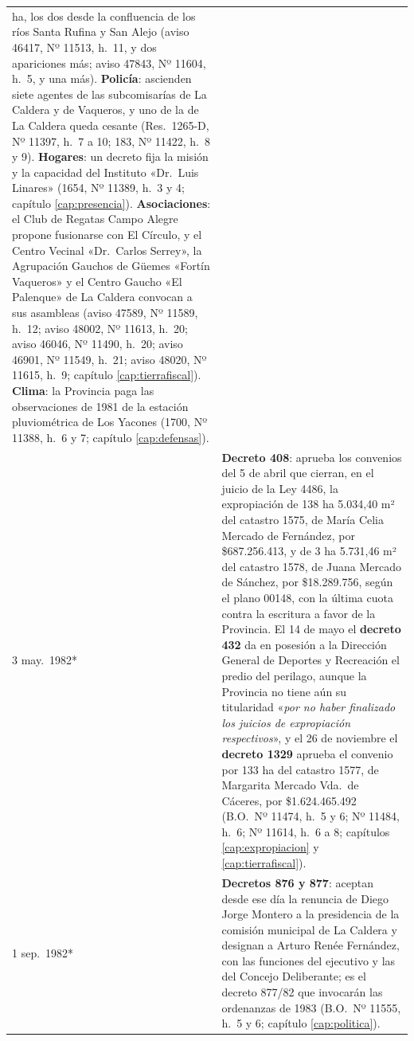\begin{longtable}{@{}p{2.7cm}p{10.3cm}@{}}
ha, los dos desde la confluencia de los ríos Santa Rufina y San Alejo (aviso 46417, Nº 11513, h.\ 11, y dos apariciones más; aviso 47843, Nº 11604, h.\ 5, y una más). \textbf{Policía}: ascienden siete agentes de las subcomisarías de La Caldera y de Vaqueros, y uno de la de La Caldera queda cesante (Res.\ 1265-D, Nº 11397, h.\ 7 a 10; 183, Nº 11422, h.\ 8 y 9). \textbf{Hogares}: un decreto fija la misión y la capacidad del Instituto «Dr.\ Luis Linares» (1654, Nº 11389, h.\ 3 y 4; capítulo \ref{cap:presencia}). \textbf{Asociaciones}: el Club de Regatas Campo Alegre propone fusionarse con El Círculo, y el Centro Vecinal «Dr.\ Carlos Serrey», la Agrupación Gauchos de Güemes «Fortín Vaqueros» y el Centro Gaucho «El Palenque» de La Caldera convocan a sus asambleas (aviso 47589, Nº 11589, h.\ 12; aviso 48002, Nº 11613, h.\ 20; aviso 46046, Nº 11490, h.\ 20; aviso 46901, Nº 11549, h.\ 21; aviso 48020, Nº 11615, h.\ 9; capítulo \ref{cap:tierrafiscal}). \textbf{Clima}: la Provincia paga las observaciones de 1981 de la estación pluviométrica de Los Yacones (1700, Nº 11388, h.\ 6 y 7; capítulo \ref{cap:defensas}). \\
3 may.\ 1982* & \textbf{Decreto 408}: aprueba los convenios del 5 de abril que cierran, en el juicio de la Ley 4486, la expropiación de 138 ha 5.034,40 m² del catastro 1575, de María Celia Mercado de Fernández, por \$687.256.413, y de 3 ha 5.731,46 m² del catastro 1578, de Juana Mercado de Sánchez, por \$18.289.756, según el plano 00148, con la última cuota contra la escritura a favor de la Provincia. El 14 de mayo el \textbf{decreto 432} da en posesión a la Dirección General de Deportes y Recreación el predio del perilago, aunque la Provincia no tiene aún su titularidad «\textit{por no haber finalizado los juicios de expropiación respectivos}», y el 26 de noviembre el \textbf{decreto 1329} aprueba el convenio por 133 ha del catastro 1577, de Margarita Mercado Vda.\ de Cáceres, por \$1.624.465.492 (B.O.\ Nº 11474, h.\ 5 y 6; Nº 11484, h.\ 6; Nº 11614, h.\ 6 a 8; capítulos \ref{cap:expropiacion} y \ref{cap:tierrafiscal}). \\
1 sep.\ 1982* & \textbf{Decretos 876 y 877}: aceptan desde ese día la renuncia de Diego Jorge Montero a la presidencia de la comisión municipal de La Caldera y designan a Arturo Renée Fernández, con las funciones del ejecutivo y las del Concejo Deliberante; es el decreto 877/82 que invocarán las ordenanzas de 1983 (B.O.\ Nº 11555, h.\ 5 y 6; capítulo \ref{cap:politica}). \\

\end{longtable}
